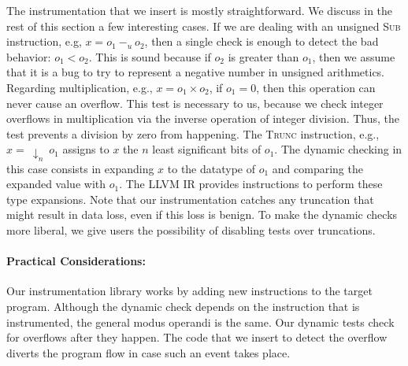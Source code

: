 \documentclass[preprint]{sigplanconf}[10pt]
\begin{document}
The instrumentation that we insert is mostly straightforward.
We discuss in the rest of this section a few interesting cases.
If we are dealing with an unsigned \textsc{Sub} instruction, e.g,
$x = o_1 \ -_u \ o_2$, then a single check is enough to detect the bad
behavior: $o_1 < o_2$.
This is sound because if $o_2$ is greater than $o_1$, then we assume that it is
a bug to try to represent a negative number in unsigned arithmetics.
Regarding multiplication, e.g., $x = o_1 \times o_2$, if $o_1 = 0$, then this
operation can never cause an overflow.
This test is necessary to us, because we check integer overflows in
multiplication via the inverse operation of integer division.
Thus, the test prevents a division by zero from happening.
The \textsc{Trunc} instruction, e.g., $x = \ \downarrow_n \ o_1$ assigns to $x$
the $n$ least significant bits of $o_1$.
The dynamic checking in this case consists in expanding $x$ to
the datatype of $o_1$ and comparing the expanded value with $o_1$.
The LLVM IR provides instructions to perform these type expansions.
Note that our instrumentation catches any truncation that might result in
data loss, even if this loss is benign.
To make the dynamic checks more liberal, we give users the possibility of
disabling tests over truncations.

\paragraph{Practical Considerations: }
Our instrumentation library works by adding new instructions to
the target program.
Although the dynamic check depends on the instruction that is instrumented,
the general modus operandi is the same.
Our dynamic tests check for overflows after they happen.
The code that we insert to detect the overflow diverts the program flow in case
such an event takes place.
\end{document}
